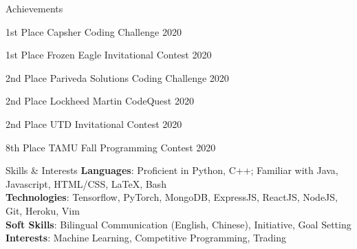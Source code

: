 \documentclass{resume} %
\begin{document}

\begin{rSection}{Achievements}
\begin{rSubsection}{}{}{}{}
    \item 1st Place Capsher Coding Challenge 2020
    \item 1st Place Frozen Eagle Invitational Contest 2020
    \item 2nd Place Pariveda Solutions Coding Challenge 2020
    \item 2nd Place Lockheed Martin CodeQuest 2020
    \item 2nd Place UTD Invitational Contest 2020
    \item 8th Place TAMU Fall Programming Contest 2020
\end{rSubsection}
\end{rSection}


\begin{rSection}{Skills \& Interests}
{\bf Languages}:
Proficient in Python, C++; Familiar with Java, Javascript, HTML/CSS, LaTeX, Bash \\
{\bf Technologies}:
Tensorflow, PyTorch, MongoDB, ExpressJS, ReactJS, NodeJS, Git, Heroku, Vim\\
{\bf Soft Skills}:
Bilingual Communication (English, Chinese), Initiative, Goal Setting\\
{\bf Interests}:
Machine Learning, Competitive Programming, Trading
\end{rSection}



\end{document}
